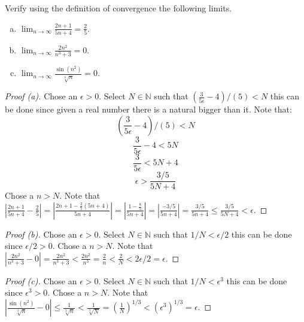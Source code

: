 \documentclass[12pt]{article}
\makeatletter
\theoremstyle{homework}
\newenvironment{exercise}[1]
{\def\@currentlabel{#1}\exercisecore}
{\endexercisecore}
\makeatother
\begin{document}
\begin{exercise}{2.2.2} Verify using the definition of convergence
the following limits.
\begin{enumerate}[(a)]
\item $\displaystyle \lim_{n\rightarrow\infty} \frac{2n+1}{5n+4} = \frac{2}{5}$.
\item $\displaystyle \lim_{n\rightarrow\infty} \frac{2n^2}{n^3+3} = 0$.
\item $\displaystyle \lim_{n\rightarrow\infty} \frac{\sin(n^2)}{\sqrt[3]{n}}=0$.
\end{enumerate}
\end{exercise}
\begin{proof}[Proof (a)]
Chose an $\epsilon >0$.  Select $N\in\mathbb{N}$ such that $(\frac{3}{5\epsilon}-4)/(5)<N$ this can be done since given a real number there is a natural bigger than it.  Note that:
$$(\frac{3}{5\epsilon}-4)/(5)<N$$
$$\frac{3}{5\epsilon}-4<5N$$
$$\frac{3}{5\epsilon}<5N+4$$
$$\epsilon>\frac{3/5}{5N+4}$$
Chose a $n>N$.  Note that $|\frac{2n+1}{5n+4}-\frac{2}{5}|=|\frac{2n+1-\frac{2}{5}(5n+4)}{5n+4}|=|\frac{1-\frac{8}{5}}{5n+4}|=|\frac{-3/5}{5n+4}|=\frac{3/5}{5n+4}\leq \frac{3/5}{5N+4}<\epsilon$.
\end{proof}
\begin{proof}[Proof (b)]
Chose an $\epsilon >0$.  Select $N\in\mathbb{N}$ such that $1/N<\epsilon/2$ this can be done since $\epsilon/2>0$.  Chose a $n>N$.  Note that $|\frac{2n^2}{n^3+3}-0|=\frac{2n^2}{n^3+3}<\frac{2n^2}{n^3}=\frac{2}{n}<\frac{2}{N}<2\epsilon/2=\epsilon$.
\end{proof}
\begin{proof}[Proof (c)]
Chose an $\epsilon >0$.  Select $N\in\mathbb{N}$ such that $1/N<\epsilon^3$ this can be done since $\epsilon^3>0$.  Chose a $n>N$.  Note that $|\frac{\sin(n^2)}{\sqrt[3]{n}}-0|\leq \frac{1}{\sqrt[3]{n}}<\frac{1}{\sqrt[3]{N}}=(\frac{1}{N})^{1/3}<(\epsilon^3)^{1/3}=\epsilon$.
\end{proof}

\newpage
\end{document}
